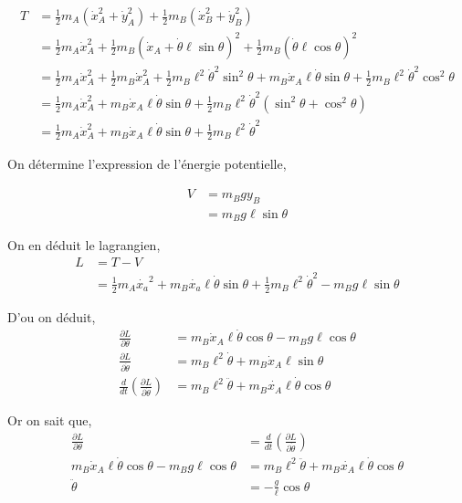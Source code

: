 \documentclass[10pt]{article}
\renewcommand{\delta}{\partial}
\begin{document}
\begin{align*}
T &= \frac{1}{2}m_A(\dot{x}_A ^2 + \dot{y}_A ^2) + \frac{1}{2}m_B(\dot{x}_B ^2 + \dot{y}_B ^2) \\
 &= \frac{1}{2}m_A\dot{x}_A ^2 + \frac{1}{2}m_B(\dot{x}_A+\dot{\theta}\ell\sin{\theta})^2 + \frac{1}{2}m_B(\dot{\theta}\ell\cos{\theta})^2 \\
 &= \frac{1}{2}m_A\dot{x}_A ^2 + \frac{1}{2}m_B\dot{x}_A ^2
 + \frac{1}{2}m_B \ell^2\dot{\theta}^2\sin^2{\theta} + m_B\dot{x}_A\ell\dot{\theta}\sin{\theta} 
 + \frac{1}{2}m_B\ell^2\dot{\theta}^2 \cos^2{\theta} \\
 &= \frac{1}{2}m_A\dot{x}_A ^2 + m_B\dot{x}_A\ell\dot{\theta}\sin{\theta}
 + \frac{1}{2}m_B \ell^2\dot{\theta}^2(\sin^2{\theta} + \cos^2{\theta}) \\
 &= \frac{1}{2}m_A\dot{x}_A ^2 + m_B\dot{x}_A\ell\dot{\theta}\sin{\theta}
 + \frac{1}{2}m_B \ell^2\dot{\theta}^2
\end{align*}

On détermine l'expression de l'énergie potentielle,

\begin{align*}
V &=m_Bgy_B \\
  &=m_Bg\ell\sin{\theta}
\end{align*}

On en déduit le lagrangien,
\begin{align*}
L &= T - V \\
 &= \frac{1}{2}m_A\dot{x_a}^2 + m_B\dot{x_a}\ell\dot{\theta}\sin{\theta}
 + \frac{1}{2}m_B \ell^2\dot{\theta}^2 -  m_Bg\ell\sin{\theta}
\end{align*}

D'ou on déduit,
\begin{align*}
 \frac{\delta L}{\delta\theta} &= m_B\dot{x}_A\ell\dot{\theta}\cos{\theta}-m_Bg\ell\cos{\theta} \\
 \frac{\delta L}{\delta \dot{\theta}} &= m_B\ell^2\dot{\theta} + m_B\dot{x}_A\ell\sin{\theta} \\
 \frac{d}{dt}\left(\frac{\delta L}{\delta \dot{\theta}}\right) &= m_B\ell^2\ddot{\theta}+m_B\dot{x_A}\ell\dot{\theta}\cos{\theta} 
\end{align*}

Or on sait que,
\begin{align*}
  \frac{\delta L}{\delta\theta} &= \frac{d}{dt}\left(\frac{\delta L}{\delta \dot{\theta}}\right) \\
  m_B\dot{x}_A\ell\dot{\theta}\cos{\theta}-m_Bg\ell\cos{\theta} &=  m_B\ell^2\ddot{\theta}+m_B\dot{x_A}\ell\dot{\theta}\cos{\theta}  \\
  \ddot{\theta} &= -\frac{g}{\ell}\cos{\theta}
\end{align*}
\end{document}
